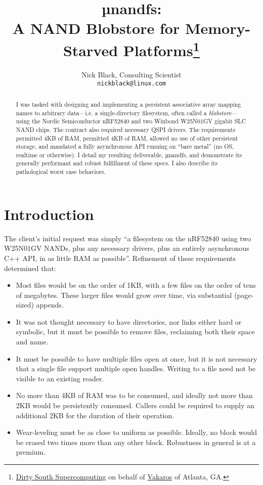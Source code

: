 \documentclass[letterpaper,10pt]{article}
\title{µnandfs:\\
A NAND Blobstore for Memory-Starved Platforms\thanks{
 \href{https://www.dsscaw.com/}{Dirty South Supercomputing} on behalf
 of \href{https://www.vakaros.com/}{Vakaros} of Atlanta, GA.
}\\
}
\author{Nick Black, Consulting Scientist\\
\texttt{nickblack@linux.com}
}
\newenvironment{denseitemize}{
  \begin{itemize}
      \setlength{\itemsep}{0pt}
}{
  \end{itemize}
}
\begin{document}
\maketitle
\thispagestyle{fancy}
\date{}
\begin{abstract}
I was tasked with designing and implementing a persistent associative array
mapping names to arbitrary data---i.e. a single-directory filesystem, often
called a \textit{blobstore}---using the Nordic Semiconductor nRF52840 and two
Winbond W25N01GV gigabit SLC NAND chips. The contract also required necessary
QSPI drivers. The requirements permitted 4KB of RAM, permitted 4KB of RAM,
allowed no use of other persistent storage, and mandated a fully asynchronous
API running on ``bare metal'' (no OS, realtime or otherwise). I detail my
resulting deliverable, µnandfs, and demonstrate its generally performant
and robust fulfillment of these specs. I also describe its pathological worst
case behaviors.
\end{abstract}
\section{Introduction}
The client's initial request was simply ``a filesystem on the nRF52840 using
two W25N01GV NANDs, plus any necessary drivers, plus an entirely asynchronous
C++ API, in as little RAM as possible''. Refinement of these requirements
determined that:
\begin{denseitemize}
\item Most files would be on the order of 1KB, with a few files
       on the order of tens of megabytes. These larger files would grow
       over time, via substantial (page-sized) appends.
\item It was not thought necessary to have directories, nor links either hard
       or symbolic, but it must be possible to remove files, reclaiming both their space and
       name.
\item It must be possible to have multiple files open at once, but it is not
       necessary that a single file support multiple open handles. Writing
       to a file need not be visible to an existing reader.
\item No more than 4KB of RAM was to be consumed, and ideally not more than 2KB
       would be persistently consumed. Callers could be required to supply
       an additional 2KB for the duration of their operation.
\item Wear-leveling must be as close to uniform as possible. Ideally, no block
       would be erased two times more than any other block. Robustness in
       general is at a premium.
\end{denseitemize}
\end{document}
